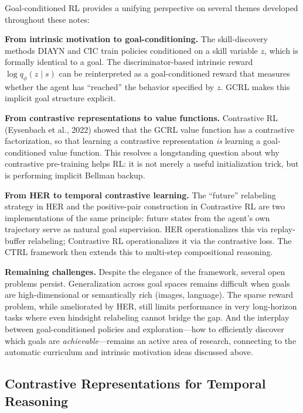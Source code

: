 \documentclass[11pt, letterpaper]{article}
\begin{document}
\begin{remark}
    Goal-conditioned RL provides a unifying perspective on several themes developed throughout these notes:
 
    \textbf{From intrinsic motivation to goal-conditioning.} The skill-discovery methods DIAYN and CIC train policies conditioned on a skill variable \(z\), which is formally identical to a goal. The discriminator-based intrinsic reward \(\log q_\phi(z \mid s)\) can be reinterpreted as a goal-conditioned reward that measures whether the agent has ``reached'' the behavior specified by \(z\). GCRL makes this implicit goal structure explicit.
 
    \textbf{From contrastive representations to value functions.} Contrastive RL (Eysenbach et al., 2022) showed that the GCRL value function has a contrastive factorization, so that learning a contrastive representation \textit{is} learning a goal-conditioned value function. This resolves a longstanding question about why contrastive pre-training helps RL: it is not merely a useful initialization trick, but is performing implicit Bellman backup.
 
    \textbf{From HER to temporal contrastive learning.} The ``future'' relabeling strategy in HER and the positive-pair construction in Contrastive RL are two implementations of the same principle: future states from the agent's own trajectory serve as natural goal supervision. HER operationalizes this via replay-buffer relabeling; Contrastive RL operationalizes it via the contrastive loss. The CTRL framework then extends this to multi-step compositional reasoning.
 
    \textbf{Remaining challenges.} Despite the elegance of the framework, several open problems persist. Generalization across goal spaces remains difficult when goals are high-dimensional or semantically rich (images, language). The sparse reward problem, while ameliorated by HER, still limits performance in very long-horizon tasks where even hindsight relabeling cannot bridge the gap. And the interplay between goal-conditioned policies and exploration---how to efficiently discover which goals are \textit{achievable}---remains an active area of research, connecting to the automatic curriculum and intrinsic motivation ideas discussed above.
\end{remark}
 
\subsection{Contrastive Representations for Temporal Reasoning}
 
\end{document}
